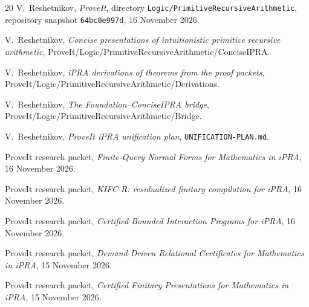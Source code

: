 \documentclass[11pt]{article}
\theoremstyle{remark}
\begin{document}
\begin{thebibliography}{20}
V.~Reshetnikov, \emph{ProveIt}, directory \texttt{Logic/PrimitiveRecursiveArithmetic}, repository snapshot \texttt{64bc0e997d}, 16 November 2026.

V.~Reshetnikov, \emph{Concise presentations of intuitionistic primitive recursive arithmetic}, ProveIt/Logic/PrimitiveRecursiveArithmetic/ConciseIPRA.

V.~Reshetnikov, \emph{iPRA derivations of theorems from the proof packets}, ProveIt/Logic/PrimitiveRecursiveArithmetic/Derivations.

V.~Reshetnikov, \emph{The Foundation--ConciseIPRA bridge}, ProveIt/Logic/PrimitiveRecursiveArithmetic/Bridge.

V.~Reshetnikov, \emph{ProveIt iPRA unification plan}, \texttt{UNIFICATION-PLAN.md}.

ProveIt research packet, \emph{Finite-Query Normal Forms for Mathematics in iPRA}, 16 November 2026.

ProveIt research packet, \emph{KIFC-R: residualized finitary compilation for iPRA}, 16 November 2026.

ProveIt research packet, \emph{Certified Bounded Interaction Programs for iPRA}, 16 November 2026.

ProveIt research packet, \emph{Demand-Driven Relational Certificates for Mathematics in iPRA}, 15 November 2026.

ProveIt research packet, \emph{Certified Finitary Presentations for Mathematics in iPRA}, 15 November 2026.
\end{thebibliography}
\end{document}
